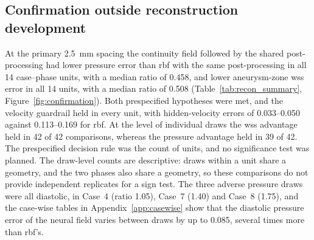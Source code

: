 \documentclass[12pt,a4paper]{article}
\newcommand{\WSS}{\ac{wss}\xspace}
\newcommand{\RBF}{\ac{rbf}\xspace}
\theoremstyle{definition}
\numberwithin{equation}{section}
\begin{document}



\subsection{Confirmation outside reconstruction development}
\label{sec:confirmation}
At the primary 2.5~mm spacing the continuity field followed by the shared post-processing had lower pressure error than \RBF with the same post-processing in all 14 case--phase units, with a median ratio of 0.458, and lower aneurysm-zone \WSS error in all 14 units, with a median ratio of 0.508 (Table~\ref{tab:recon_summary}, Figure~\ref{fig:confirmation}). Both prespecified hypotheses were met, and the velocity guardrail held in every unit, with hidden-velocity errors of 0.033--0.050 against 0.113--0.169 for \RBF. At the level of individual draws the \WSS advantage held in 42 of 42 comparisons, whereas the pressure advantage held in 39 of 42. The prespecified decision rule was the count of units, and no significance test was planned. The draw-level counts are descriptive: draws within a unit share a geometry, and the two phases also share a geometry, so these comparisons do not provide independent replicates for a sign test. The three adverse pressure draws were all diastolic, in Case~4 (ratio 1.05), Case~7 (1.40) and Case~8 (1.75), and the case-wise tables in Appendix~\ref{app:casewise} show that the diastolic pressure error of the neural field varies between draws by up to 0.085, several times more than \RBF's.


\end{document}
